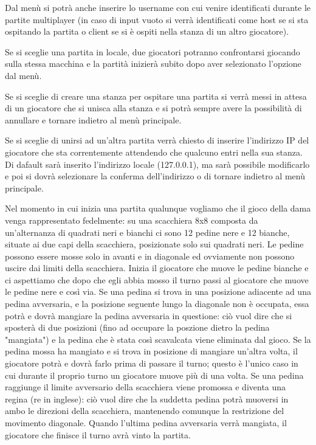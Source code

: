 \documentclass[12pt]{article}
\begin{document}
Dal menù si potrà anche inserire lo username con cui venire identificati durante le partite multiplayer (in caso di input vuoto si verrà identificati come host se si sta ospitando la partita o client se si è ospiti nella stanza di un altro giocatore).

Se si sceglie una partita in locale, due giocatori potranno confrontarsi giocando sulla stessa macchina e la partità inizierà subito dopo aver selezionato l'opzione dal menù.

Se si sceglie di creare una stanza per ospitare una partita si verrà messi in attesa di un giocatore che si unisca alla stanza e si potrà sempre avere la possibilità di annullare e tornare indietro al menù principale.

Se si sceglie di unirsi ad un'altra partita verrà chiesto di inserire l'indirizzo IP del giocatore che sta correntemente attendendo che qualcuno entri nella sua stanza. Di dafault sarà inserito l'indirizzo locale (127.0.0.1), ma sarà possibile modificarlo e poi si dovrà selezionare la conferma dell'indirizzo o di tornare indietro al menù principale.

Nel momento in cui inizia una partita qualunque vogliamo che il gioco della dama venga rappresentato fedelmente: su una scacchiera 8x8 composta da un'alternanza di quadrati neri e bianchi ci sono 12 pedine nere e 12 bianche, situate ai due capi della scacchiera, posizionate solo sui quadrati neri. Le pedine possono essere mosse solo in avanti e in diagonale ed ovviamente non possono uscire dai limiti della scacchiera. Inizia il giocatore che muove le pedine bianche e ci aspettiamo che dopo che egli abbia mosso il turno passi al giocatore che muove le pedine nere e così via. Se una pedina si trova in una posizione adiacente ad una pedina avversaria, e la posizione seguente lungo la diagonale non è occupata, essa potrà e dovrà mangiare la pedina avversaria in questione: ciò vuol dire che si sposterà di due posizioni (fino ad occupare la poszione dietro la pedina "mangiata") e la pedina che è stata così scavalcata viene eliminata dal gioco. Se la pedina mossa ha mangiato e si trova in posizione di mangiare un'altra volta, il giocatore potrà e dovrà farlo prima di passare il turno; questo è l'unico caso in cui durante il proprio turno un giocatore muove più di una volta. Se una pedina raggiunge il limite avversario della scacchiera viene promossa e diventa una regina (re in inglese): ciò vuol dire che la suddetta pedina potrà muoversi in ambo le direzioni della scacchiera, mantenendo comunque la restrizione del movimento diagonale. Quando l'ultima pedina avversaria verrà mangiata, il giocatore che finisce il turno avrà vinto la partita.
\end{document}
